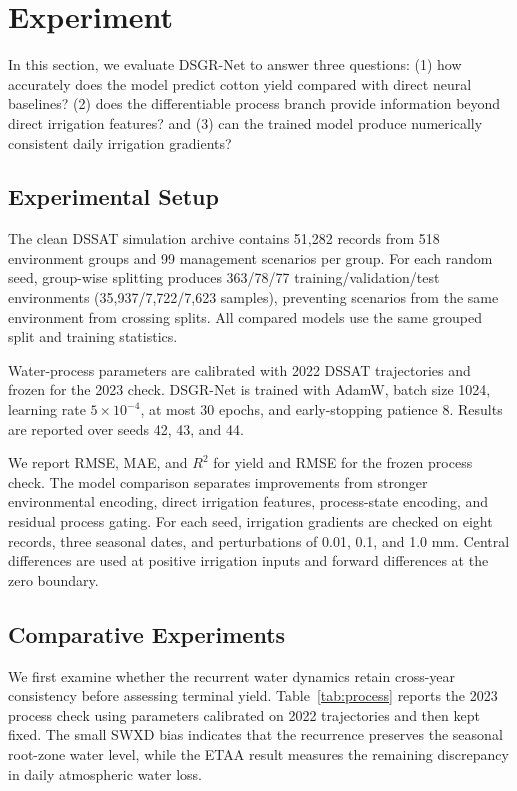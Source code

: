 \documentclass{article}
\begin{document}
\section{Experiment}
In this section, we evaluate DSGR-Net to answer three questions: (1) how accurately does the model predict cotton yield compared with direct neural baselines? (2) does the differentiable process branch provide information beyond direct irrigation features? and (3) can the trained model produce numerically consistent daily irrigation gradients?

\subsection{Experimental Setup}
The clean DSSAT simulation archive contains 51,282 records from 518 environment groups and 99 management scenarios per group. For each random seed, group-wise splitting produces 363/78/77 training/validation/test environments (35,937/7,722/7,623 samples), preventing scenarios from the same environment from crossing splits. All compared models use the same grouped split and training statistics.

Water-process parameters are calibrated with 2022 DSSAT trajectories and frozen for the 2023 check. DSGR-Net is trained with AdamW, batch size 1024, learning rate $5\times10^{-4}$, at most 30 epochs, and early-stopping patience 8. Results are reported over seeds 42, 43, and 44.

We report RMSE, MAE, and $R^2$ for yield and RMSE for the frozen process check. The model comparison separates improvements from stronger environmental encoding, direct irrigation features, process-state encoding, and residual process gating. For each seed, irrigation gradients are checked on eight records, three seasonal dates, and perturbations of 0.01, 0.1, and 1.0 mm. Central differences are used at positive irrigation inputs and forward differences at the zero boundary.

\subsection{Comparative Experiments}
We first examine whether the recurrent water dynamics retain cross-year consistency before assessing terminal yield. Table~\ref{tab:process} reports the 2023 process check using parameters calibrated on 2022 trajectories and then kept fixed. The small SWXD bias indicates that the recurrence preserves the seasonal root-zone water level, while the ETAA result measures the remaining discrepancy in daily atmospheric water loss.
\end{document}
